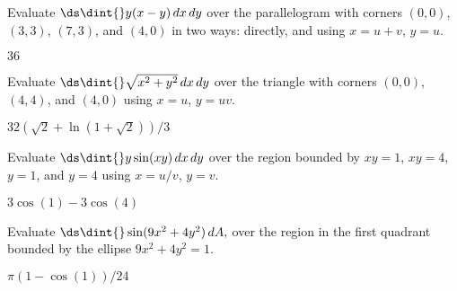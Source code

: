 \begin{exercises}
\begin{exercise} Evaluate $\ds\dint{} y(x-y)\,dx\,dy$ over the parallelogram
with corners $(0,0)$, $(3,3)$, $(7,3)$, and $(4,0)$ in two ways:
directly, and using $x=u+v$, $y=u$.
\begin{answer} $36$
\end{answer}\end{exercise}

\begin{exercise} Evaluate $\ds\dint{} \sqrt{x^2+y^2}\,dx\,dy$ over the
triangle with corners $(0,0)$, $(4,4)$, and $(4,0)$ using $x=u$, $y=uv$.
\begin{answer} $32(\sqrt2+\ln(1+\sqrt2))/3$
\end{answer}\end{exercise}

\begin{exercise} Evaluate $\ds\dint{} y\sin(xy)\,dx\,dy$ over the
region bounded by $xy=1$, $xy=4$, $y=1$, and $y=4$ using
$x=u/v$, $y=v$.
\begin{answer} $3\cos(1)-3\cos(4)$
\end{answer}\end{exercise}

\begin{exercise} Evaluate $\ds\dint{} \sin(9x^2 + 4y^2)\,dA,$ over the region
 in the first quadrant bounded by the ellipse $9x^2+4y^2 = 1$.
\begin{answer} $\pi(1-\cos(1))/24$
\end{answer}\end{exercise}


\end{exercises}
